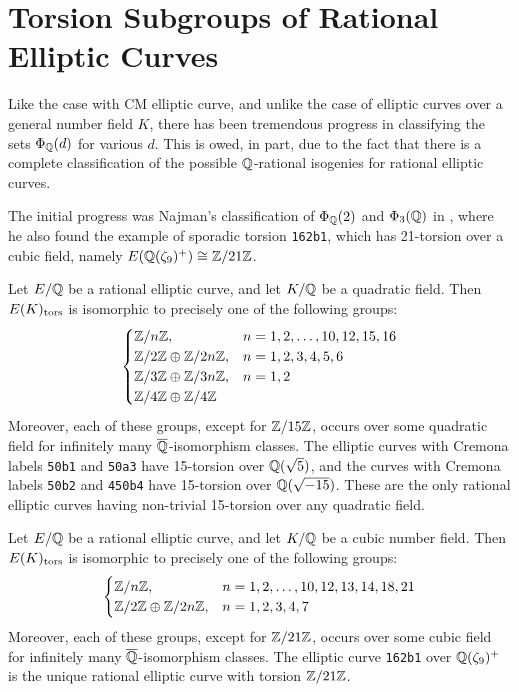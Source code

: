 \section{Torsion Subgroups of Rational Elliptic Curves}

Like the case with CM elliptic curve, and unlike the case of elliptic curves over a general number field $K$, there has been tremendous progress in classifying the sets $\Phi_{\mathbb{Q}}(d)$ for various $d$. This is owed, in part, due to the fact that there is a complete classification of the possible $\mathbb{Q}$-rational isogenies for rational elliptic curves. 


The initial progress was Najman's classification of $\Phi_{\mathbb{Q}}(2)$ and $\Phi_3(\mathbb{Q})$ in \cite{najman16}, where he also found the example of sporadic torsion \texttt{162b1}, which has 21-torsion over a cubic field, namely $E(\mathbb{Q}(\zeta_9)^+) \cong \mathbb{Z}/21\mathbb{Z}$.


\begin{thm} \label{thm:quadratictorsion}
Let $E/\mathbb{Q}$ be a rational elliptic curve, and let $K/\mathbb{Q}$ be a quadratic field. Then $E(K)_{\text{tors}}$ is isomorphic to precisely one of the following groups:
	\[
	\begin{cases}
	\mathbb{Z}/n\mathbb{Z}, & n= 1, 2, \ldots, 10, 12, 15, 16 \\
	\mathbb{Z}/2\mathbb{Z} \oplus \mathbb{Z}/2n\mathbb{Z}, & n= 1, 2, 3, 4, 5, 6 \\
	\mathbb{Z}/3\mathbb{Z} \oplus \mathbb{Z}/3n\mathbb{Z}, & n= 1, 2 \\
	\mathbb{Z}/4\mathbb{Z} \oplus \mathbb{Z}/4\mathbb{Z}
	\end{cases}
	\]
Moreover, each of these groups, except for $\mathbb{Z}/15\mathbb{Z}$, occurs over some quadratic field for infinitely many $\overline{\mathbb{Q}}$-isomorphism classes. The elliptic curves with Cremona labels \texttt{50b1} and \texttt{50a3} have 15-torsion over $\mathbb{Q}(\sqrt{5})$, and the curves with Cremona labels \texttt{50b2} and \texttt{450b4} have 15-torsion over $\mathbb{Q}(\sqrt{-15})$. These are the only rational elliptic curves having non-trivial 15-torsion over any quadratic field.
\end{thm}


\begin{thm} \label{thm:cubictorsion}
Let $E/\mathbb{Q}$ be a rational elliptic curve, and let $K/\mathbb{Q}$ be a cubic number field. Then $E(K)_{\text{tors}}$ is isomorphic to precisely one of the following groups:
	\[
	\begin{cases}
	\mathbb{Z}/n\mathbb{Z}, & n= 1, 2, \ldots, 10, 12, 13, 14, 18, 21 \\
	\mathbb{Z}/2\mathbb{Z} \oplus \mathbb{Z}/2n\mathbb{Z}, & n= 1, 2, 3, 4, 7
	\end{cases}
	\]
Moreover, each of these groups, except for $\mathbb{Z}/21\mathbb{Z}$, occurs over some cubic field for infinitely many $\overline{\mathbb{Q}}$-isomorphism classes. The elliptic curve \texttt{162b1} over $\mathbb{Q}(\zeta_9)^+$ is the unique rational elliptic curve with torsion $\mathbb{Z}/21\mathbb{Z}$. 
\end{thm}


